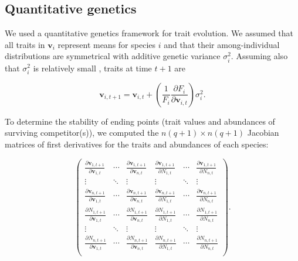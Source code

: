 \subsection*{Quantitative genetics}

We used a quantitative genetics framework for trait evolution.
We assumed that all traits in $\mathbf{v}_i$ represent means for species $i$
and that their among-individual distributions are symmetrical with additive
genetic variance $\sigma^2_i$.
Assuming also that $\sigma^2_i$ is relatively small
\citep{Iwasa:1991eo,Abrams:2001va,Abrams:1993cr}, traits at time $t+1$ are

\begin{equation} \label{eq:trait-change}
    \mathbf{v}_{i,t+1} = \mathbf{v}_{i,t} + \left( \frac{1}{F_i}
        \frac{\partial F_i}{\partial \mathbf{v}_{i,t}} \right) \sigma^2_i
    \textrm{.}
\end{equation}

To determine the stability of ending points (trait values and abundances of
surviving competitor(s)), we computed the $n (q+1) \times n (q+1)$ Jacobian matrices
of first derivatives for the traits and abundances of each species:

\begin{equation} \label{eq:jacobian}
    \begin{pmatrix}
        \frac{\partial \mathbf{v}_{1,t+1}}{\partial \mathbf{v}_{1,t}} & \cdots &
            \frac{\partial \mathbf{v}_{1,t+1}}{\partial \mathbf{v}_{n,t}} &
            \frac{\partial \mathbf{v}_{1,t+1}}{\partial N_{1,t}} & \cdots &
            \frac{\partial \mathbf{v}_{1,t+1}}{\partial N_{n,t}} \\
        \vdots & \ddots & \vdots & \vdots & \ddots & \vdots \\
        \frac{\partial \mathbf{v}_{n,t+1}}{\partial \mathbf{v}_{1,t}} & \cdots &
            \frac{\partial \mathbf{v}_{n,t+1}}{\partial \mathbf{v}_{n,t}} &
            \frac{\partial \mathbf{v}_{n,t+1}}{\partial N_{1,t}} & \cdots &
            \frac{\partial \mathbf{v}_{n,t+1}}{\partial N_{n,t}} \\[1ex]
%
%
        \frac{\partial N_{1,t+1}}{\partial \mathbf{v}_{1,t}} & \cdots &
            \frac{\partial N_{1,t+1}}{\partial \mathbf{v}_{n,t}} &
            \frac{\partial N_{1,t+1}}{\partial N_{1,t}} & \cdots &
            \frac{\partial N_{1,t+1}}{\partial N_{n,t}} \\
        \vdots & \ddots & \vdots & \vdots & \ddots & \vdots \\
        \frac{\partial N_{n,t+1}}{\partial \mathbf{v}_{1,t}} & \cdots &
            \frac{\partial N_{n,t+1}}{\partial \mathbf{v}_{n,t}} &
            \frac{\partial N_{n,t+1}}{\partial N_{1,t}} & \cdots &
            \frac{\partial N_{n,t+1}}{\partial N_{n,t}} \\
    \end{pmatrix}
    \text{.}
\end{equation}

